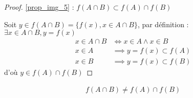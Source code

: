\begin{proof}
	\ref{prop_img_5} : $f(A \cap B) \subset f(A) \cap f(B)$ \\
	\par \noindent Soit $y \in f(A \cap B) = \{f(x), x \in A \cap B\}$, par définition : $\exists x \in A \cap B, y = f(x)$
	\begin{align*}
		x \in A \cap B &\iff x \in A \wedge x \in B \\
		x \in A &\implies y = f(x) \subset f(A) \\
		x \in B &\implies y = f(x) \subset f(B) 
	\end{align*}
	d'où $y \in f(A) \cap f(B)$
\end{proof} 

\begin{leftstroke}
\begin{remarque}
	\begin{align*}
		f(A \cap B) \neq f(A) \cap f(B)
	\end{align*}
\end{remarque}
\end{leftstroke}
